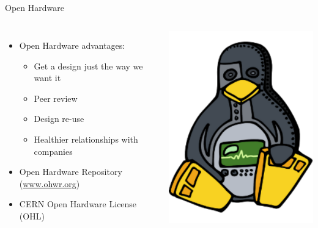 \documentclass[compress,red]{beamer}
\begin{document}
\subsection{}
\begin{frame}{Open Hardware}

  \begin{columns}[c]

      
      \begin{itemize}
        \item Open Hardware advantages:
         \begin{itemize}
            \item Get a design just the way we want it
            \item Peer review
	     \item Design re-use
	     \item Healthier relationships with companies
	\end{itemize}
        \item Open Hardware Repository (\href{http://ohwr.org}{www.ohwr.org})
	\item CERN Open Hardware License (OHL)
      \end{itemize}


    \begin{center}
      \includegraphics[width=1.0\textwidth]{../../figures/ohwr/ohr_logo.pdf}  
    \end{center}


\end{columns}
\end{frame}
\end{document}
